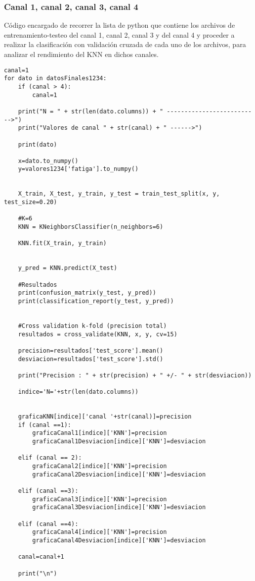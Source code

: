 \subsubsection{Canal 1, canal 2, canal 3, canal 4}
Código encargado de recorrer la lista de python que contiene los archivos de entrenamiento-testeo del canal 1, canal 2, canal 3 y del canal 4 y proceder a realizar la clasificación con validación cruzada de cada uno de los archivos, para analizar el rendimiento del KNN en dichos canales.
\begin{lstlisting}
canal=1
for dato in datosFinales1234:
    if (canal > 4):
        canal=1
    
    print("N = " + str(len(dato.columns)) + " -------------------------->")
    print("Valores de canal " + str(canal) + " ------>")
    
    print(dato)
    
    x=dato.to_numpy()
    y=valores1234['fatiga'].to_numpy()
    
    
    X_train, X_test, y_train, y_test = train_test_split(x, y, test_size=0.20)

    #K=6
    KNN = KNeighborsClassifier(n_neighbors=6)
    
    KNN.fit(X_train, y_train)


    y_pred = KNN.predict(X_test)

    #Resultados
    print(confusion_matrix(y_test, y_pred))
    print(classification_report(y_test, y_pred))

    
    #Cross validation k-fold (precision total)
    resultados = cross_validate(KNN, x, y, cv=15)
    
    precision=resultados['test_score'].mean()
    desviacion=resultados['test_score'].std()
    
    print("Precision : " + str(precision) + " +/- " + str(desviacion))
    
    indice='N='+str(len(dato.columns))
    
    
    graficaKNN[indice]['canal '+str(canal)]=precision
    if (canal ==1):
        graficaCanal1[indice]['KNN']=precision
        graficaCanal1Desviacion[indice]['KNN']=desviacion
        
    elif (canal == 2):
        graficaCanal2[indice]['KNN']=precision
        graficaCanal2Desviacion[indice]['KNN']=desviacion
        
    elif (canal ==3):
        graficaCanal3[indice]['KNN']=precision
        graficaCanal3Desviacion[indice]['KNN']=desviacion
        
    elif (canal ==4):
        graficaCanal4[indice]['KNN']=precision
        graficaCanal4Desviacion[indice]['KNN']=desviacion
        
    canal=canal+1
    
    print("\n")
\end{lstlisting}

